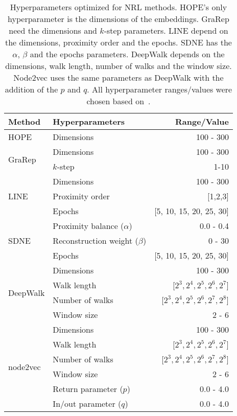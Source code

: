 \begin{table}[ht!]
    \centering
    \begin{tabular}{ |l|l|r| }
        \hline
        \textbf{Method} & \textbf{Hyperparameters} & \textbf{Range/Value} \\
        \hline
        HOPE & Dimensions & 100 - 300 \\
        \hline
        \multirow{2}{5em}{GraRep} & Dimensions & 100 - 300 \\
        & $k$-step & 1-10 \\
        \hline
        \multirow{3}{4em}{LINE} & Dimensions & 100 - 300 \\
        & Proximity order & [1,2,3] \\
        & Epochs & [5, 10, 15, 20, 25, 30] \\
        \hline
        \multirow{3}{5em}{SDNE} & Proximity balance ($\alpha$) & 0.0 - 0.4 \\
        & Reconstruction weight ($\beta$) & 0 - 30 \\
        & Epochs & [5, 10, 15, 20, 25, 30] \\
        \hline
        \multirow{4}{5em}{DeepWalk} & Dimensions & 100 - 300 \\
        & Walk length & [$2^3, 2^4, 2^5, 2^6, 2^7$] \\
        & Number of walks & [$2^3, 2^4, 2^5, 2^6, 2^7, 2^8$] \\
        & Window size & 2 - 6 \\
        \hline
        \multirow{6}{5em}{node2vec} & Dimensions & 100 - 300 \\
        & Walk length & [$2^3, 2^4, 2^5, 2^6, 2^7$] \\
        & Number of walks & [$2^3, 2^4, 2^5, 2^6, 2^7, 2^8$] \\
        & Window size & 2 - 6 \\
        & Return parameter ($p$) & 0.0 - 4.0 \\
        & In/out parameter ($q$) & 0.0 - 4.0 \\
        \hline
    \end{tabular}
    \caption[Hyperparameters optimized for network representation learning methods]{Hyperparameters optimized for \ac{NRL} methods. HOPE's only hyperparameter is the dimensions of the embeddings. GraRep need the dimensions and $k$-step parameters. LINE depend on the dimensions, proximity order and the epochs. SDNE has the $\alpha$, $\beta$ and the epochs parameters. DeepWalk depends on the dimensions, walk length, number of walks and the window size. Node2vec uses the same parameters as DeepWalk with the addition of the $p$ and $q$. All hyperparameter ranges/values were chosen based on~\cite{yue_graph_2019}.}
    \label{tab:hyperparameters}
\end{table}

